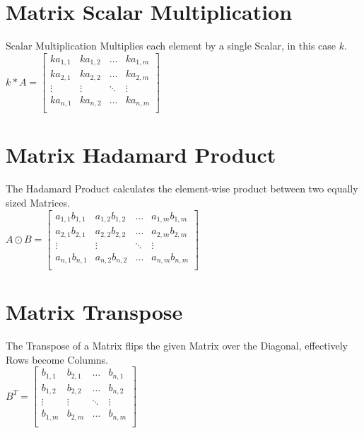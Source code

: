 \begin{flushleft}
                \chapter{Matrix Scalar Multiplication}
                    \vspace{0.2cm}
                    Scalar Multiplication Multiplies each element by a single Scalar, in this case $k$. \\
                    $
                    k * A = 
                    \begin{bmatrix}
                        ka_{1,1} & ka_{1,2} & \hdots  & ka_{1,m} \\
                        ka_{2,1} & ka_{2,2} & \hdots  & ka_{2,m} \\
                        \vdots  & \vdots  & \ddots  & \vdots  \\
                        ka_{n,1} & ka_{n,2} & \hdots  & ka_{n,m} \\
                    \end{bmatrix}
                    $
                \chapter{Matrix Hadamard Product}
                    \vspace{0.2cm}
                    The Hadamard Product calculates the element-wise product between two equally sized Matrices. \\
                    $
                    A \odot B =
                    \begin{bmatrix}
                        a_{1,1}b_{1,1} & a_{1,2}b_{1,2} & \hdots  & a_{1,m}b_{1,m} \\
                        a_{2,1}b_{2,1} & a_{2,2}b_{2,2} & \hdots  & a_{2,m}b_{2,m} \\
                        \vdots         & \vdots         & \ddots  & \vdots         \\
                        a_{n,1}b_{n,1} & a_{n,2}b_{n,2} & \hdots  & a_{n,m}b_{n,m} \\
                    \end{bmatrix}
                    $
                \chapter{Matrix Transpose}
                    \vspace{0.2cm}
                    The Transpose of a Matrix flips the given Matrix over the Diagonal, effectively Rows become Columns. \\
                    $
                    B^{T} = 
                    \begin{bmatrix}
                        b_{1,1} & b_{2,1} & \hdots  & b_{n,1} \\
                        b_{1,2} & b_{2,2} & \hdots  & b_{n,2} \\
                        \vdots  & \vdots  & \ddots  & \vdots  \\
                        b_{1,m} & b_{2,m} & \hdots  & b_{n,m} \\
                    \end{bmatrix}
                    $

\end{flushleft}
